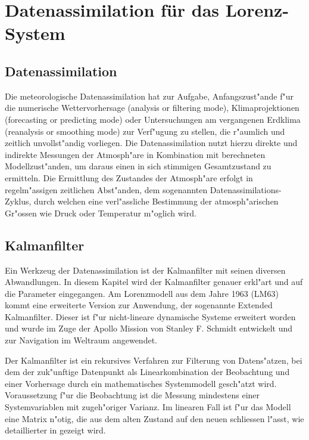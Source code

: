 %
%
%
\chapter{Datenassimilation für das Lorenz-System\label{chapter:kalman}}
\begin{refsection}

\section{Datenassimilation}
Die meteorologische Datenassimilation hat zur Aufgabe, Anfangszust"ande f"ur die numerische Wettervorhersage (analysis or filtering mode), Klimaprojektionen (forecasting or predicting mode) oder Untersuchungen am vergangenen Erdklima (reanalysis or smoothing mode) zur Verf"ugung zu stellen, die r"aumlich und zeitlich unvollst"andig vorliegen. Die Datenassimilation nutzt hierzu direkte und indirekte Messungen der Atmosph"are in Kombination mit berechneten Modellzust"anden, um daraus einen in sich stimmigen Gesamtzustand zu ermitteln. Die Ermittlung des Zustandes der Atmosph"are erfolgt in regelm"assigen zeitlichen Abst"anden, dem sogenannten Datenassimilations-Zyklus, durch welchen eine verl"assliche Bestimmung der atmosph"arischen Gr"ossen wie Druck oder Temperatur m"oglich wird.

\section{Kalmanfilter}
Ein Werkzeug der Datenassimilation ist der Kalmanfilter mit seinen diversen Abwandlungen. In diesem Kapitel wird der Kalmanfilter genauer erkl"art und auf die Parameter eingegangen. Am Lorenzmodell aus dem Jahre 1963 (LM63) kommt eine erweiterte Version zur Anwendung, der sogenannte Extended Kalmanfilter. Dieser ist f"ur nicht-lineare dynamische Systeme erweitert worden und wurde im Zuge der Apollo Mission von Stanley F. Schmidt entwickelt und zur Navigation im Weltraum angewendet\cite{skript:NASAKalman}.

Der Kalmanfilter ist ein rekursives Verfahren zur Filterung von Datens"atzen, bei dem  der zuk"unftige Datenpunkt als Linearkombination der Beobachtung und einer Vorhersage durch ein mathematisches Systemmodell gesch"atzt wird. Voraussetzung f"ur die Beobachtung ist die Messung mindestens einer Systemvariablen mit zugeh"origer Varianz. Im linearen Fall ist f"ur das Modell eine Matrix n"otig, die aus dem alten Zustand auf den neuen schliessen l"asst, wie detaillierter in\cite{skript:WRStat} gezeigt wird.\\


\end{refsection}
